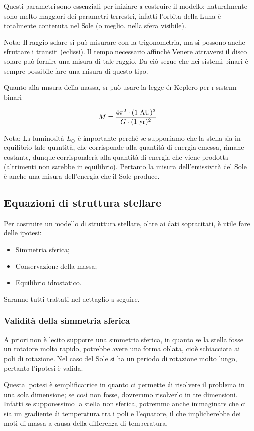 Questi parametri sono essenziali per iniziare a costruire il modello: naturalmente sono molto maggiori dei parametri terrestri, infatti l'orbita della Luna è totalmente contenuta nel Sole (o meglio, nella sfera visibile).

Nota: Il raggio solare si può misurare con la trigonometria, ma si possono anche sfruttare i transiti (eclissi). Il tempo necessario affinché Venere attraversi il disco solare può fornire una misura di tale raggio. Da ciò segue che nei sistemi binari è sempre possibile fare una misura di questo tipo.

Quanto alla misura della massa, si può usare la legge di Keplero per i sistemi binari

$$M=\frac{4\pi^2\cdot (1\ \rm AU)^3}{G\cdot (1\ \rm yr)^2}$$

Nota: La luminosità $L_{\odot}$ è importante perché se supponiamo che la stella sia in equilibrio tale quantità, che corrisponde alla quantità di energia emessa, rimane costante, dunque corrisponderà alla quantità di energia che viene prodotta (altrimenti non sarebbe in equilibrio). Pertanto la misura dell'emissività del Sole è anche una misura dell'energia che il Sole produce.

\subsection{Equazioni di struttura stellare}
Per costruire un modello di struttura stellare, oltre ai dati sopracitati, è utile fare delle ipotesi:

\begin{itemize}
    \item Simmetria sferica;
    \item Conservazione della massa;
    \item Equilibrio idrostatico.
\end{itemize}

Saranno tutti trattati nel dettaglio a seguire.
\subsubsection{Validità della simmetria sferica}
A priori non è lecito supporre una simmetria sferica, in quanto se la stella fosse un rotatore molto rapido, potrebbe avere una forma oblata, cioè schiacciata ai poli di rotazione. Nel caso del Sole si ha un periodo di rotazione molto lungo, pertanto l'ipotesi è valida.

Questa ipotesi è semplificatrice in quanto ci permette di risolvere il problema in una sola dimensione; se così non fosse, dovremmo risolverlo in tre dimensioni. Infatti se supponessimo la stella non sferica, potremmo anche immaginare che ci sia un gradiente di temperatura tra i poli e l'equatore, il che implicherebbe dei moti di massa a causa della differenza di temperatura.

